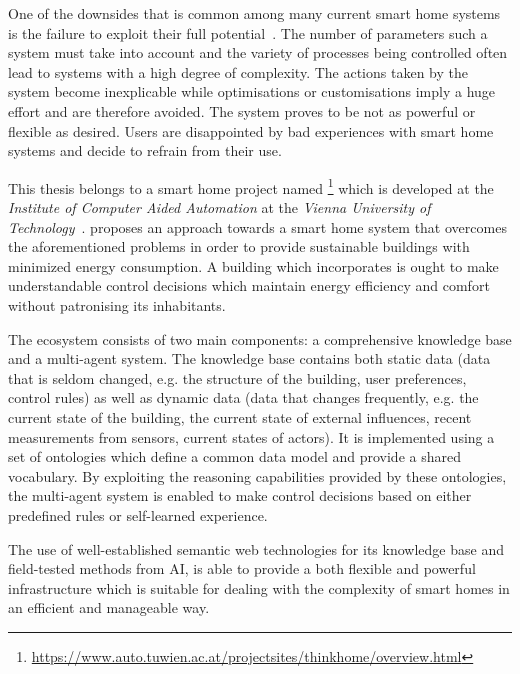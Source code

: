 One of the downsides that is common among many current smart home systems is the failure to exploit their full potential~\cite{HomeAutomationChallengesOpportunities,HomeMaestro,StateOfHomeNetworking}. The number of parameters such a system must take into account and the variety of processes being controlled often lead to systems with a high degree of complexity. The actions taken by the system become inexplicable while optimisations or customisations imply a huge effort and are therefore avoided. The system proves to be not as powerful or flexible as desired. Users are disappointed by bad experiences with smart home systems and decide to refrain from their use.

This thesis belongs to a smart home project named \thinkhome\footnote{\href{https://www.auto.tuwien.ac.at/projectsites/thinkhome/overview.html}{https://www.auto.tuwien.ac.at/projectsites/thinkhome/overview.html}} which is developed at the \emph{Institute of Computer Aided Automation} at the \emph{Vienna University of Technology}~\cite{CR2011-TH_Journal,CR2010-DEST_ThinkHome}. \thinkhome proposes an approach towards a smart home system that overcomes the aforementioned problems in order to provide sustainable buildings with minimized energy consumption. A building which incorporates \thinkhome is ought to make understandable control decisions which maintain energy efficiency and comfort without patronising its inhabitants.

The \thinkhome ecosystem consists of two main components: a comprehensive knowledge base and a multi-agent system. The knowledge base contains both static data (data that is seldom changed, e.g. the structure of the building, user preferences, control rules) as well as dynamic data (data that changes frequently, e.g. the current state of the building, the current state of external influences, recent measurements from sensors, current states of actors). It is implemented using a set of ontologies which define a common data model and provide a shared vocabulary. By exploiting the reasoning capabilities provided by these ontologies, the multi-agent system is enabled to make control decisions based on either predefined rules or self-learned experience.

The use of well-established semantic web technologies for its knowledge base and field-tested methods from AI, \thinkhome is able to provide a both flexible and powerful infrastructure which is suitable for dealing with the complexity of smart homes in an efficient and manageable way.

